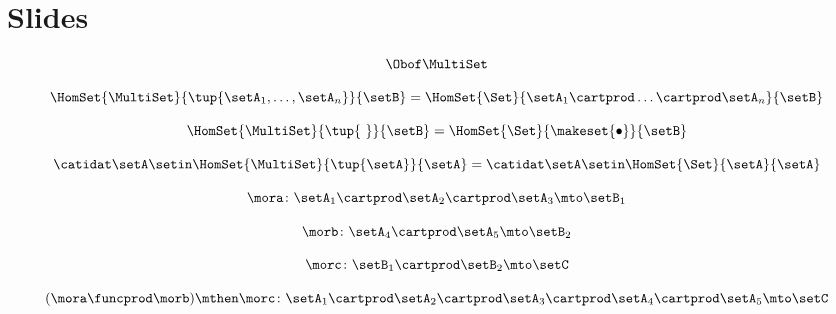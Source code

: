 
\section{Slides}
\label{sec:multicategories-slides}

\begin{forslides}

    \begin{equation}
        \label{eq:slides_multicategories_00}
       \Obof\MultiSet
    \end{equation}
    
    \begin{equation}
        \label{eq:slides_multicategories_01}
       \HomSet{\MultiSet}{\tup{\setA_1,\ldots,\setA_n}}{\setB}=\HomSet{\Set}{\setA_1 \cartprod \ldots \cartprod \setA_n}{\setB}
    \end{equation}
    
     \begin{equation}
        \label{eq:slides_multicategories_02}
       \HomSet{\MultiSet}{\tup{ \ }}{\setB}=\HomSet{\Set}{\makeset{ \bullet }}{\setB}
    \end{equation}
    
     \begin{equation}
        \label{eq:slides_multicategories_03}
      \catidat\setA \setin \HomSet{\MultiSet}{\tup{\setA}}{\setA}=\catidat\setA \setin \HomSet{\Set}{\setA}{\setA}
    \end{equation}
    
     \begin{equation}
        \label{eq:slides_multicategories_04}
      \mora \colon \setA_1 \cartprod \setA_2 \cartprod \setA_3 \mto \setB_1
    \end{equation}
    
    \begin{equation}
        \label{eq:slides_multicategories_05}
       \morb \colon \setA_4 \cartprod \setA_5 \mto \setB_2
    \end{equation}
    
     \begin{equation}
        \label{eq:slides_multicategories_06}
       \morc \colon \setB_1 \cartprod \setB_2 \mto \setC
    \end{equation}
    
     \begin{equation}
        \label{eq:slides_multicategories_07}
      (\mora \funcprod \morb) \mthen \morc \colon \setA_1 \cartprod \setA_2 \cartprod \setA_3 \cartprod \setA_4 \cartprod \setA_5 \mto \setC
    \end{equation}
    

\end{forslides}
